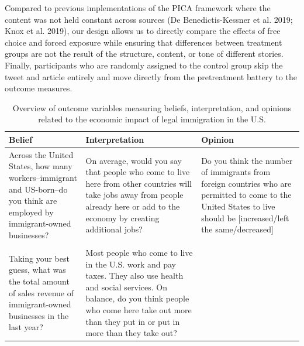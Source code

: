 \documentclass[
  12pt,
]{article}
\begin{document}
\doublespace

\noindent Compared to previous implementations of the PICA framework
where the content was not held constant across sources (De
Benedictis-Kessner et al. 2019; Knox et al. 2019), our design allows us
to directly compare the effects of free choice and forced exposure while
ensuring that differences between treatment groups are not the result of
the structure, content, or tone of different stories. Finally,
participants who are randomly assigned to the control group skip the
tweet and article entirely and move directly from the pretreatment
battery to the outcome measures.

\begin{table}[!h]

\caption{\label{tab:tab_outcomes}\label{tab:outcomes}Overview of outcome variables measuring beliefs, interpretation, and opinions related to the economic impact of legal immigration in the U.S.}
\centering
\begin{tabular}[t]{>{\raggedright\arraybackslash}p{4cm}>{\raggedright\arraybackslash}p{6cm}>{\raggedright\arraybackslash}p{5cm}}
\toprule
Belief & Interpretation & Opinion\\
\midrule
Across the United States, how many workers--immigrant and US-born--do you think are employed by immigrant-owned businesses? & On average, would you say that people who come to live here from other countries will take jobs away from people already here or add to the economy by creating additional jobs? & Do you think the number of immigrants from foreign countries who are permitted to come to the United States to live should be [increased/left the same/decreased]\\
 &  & \\
Taking your best guess, what was the total amount of sales revenue of immigrant-owned businesses in the last year? & Most people who come to live in the U.S. work and pay taxes. They also use health and social services. On balance, do you think people who come here take out more than they put in or put in more than they take out? & \\
\bottomrule
\end{tabular}
\end{table}
\end{document}
